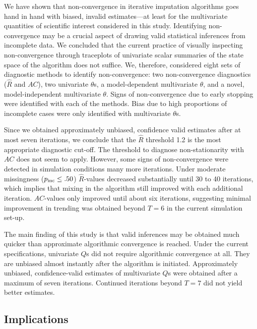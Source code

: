 \documentclass[Royal,times,sageh]{sagej}
\begin{document}
We have shown that non-convergence in iterative imputation algorithms goes hand in hand with biased, invalid estimates---at least for the multivariate quantities of scientific interest considered in this study. Identifying non-convergence may be a crucial aspect of drawing valid statistical inferences from incomplete data. We concluded that the current practice of visually inspecting non-convergence through traceplots of univariate scalar summaries of the state space of the algorithm does not suffice. We, therefore, considered eight sets of diagnostic methods to identify non-convergence: two non-convergence diagnostics (\(\widehat{R}\) and \(AC\)), two univariate \(\theta\)s, a model-dependent multivariate \(\theta\), and a novel, model-independent multivariate \(\theta\). Signs of non-convergence due to early stopping were identified with each of the methods. Bias due to high proportions of incomplete cases were only identified with multivariate \(\theta\)s.

Since we obtained approximately unbiased, confidence valid estimates after at most seven iterations, we conclude that the \(\widehat{R}\) threshold 1.2 is the most appropriate diagnostic cut-off. The threshold to diagnose non-stationarity with \(AC\) does not seem to apply. However, some signs of non-convergence were detected in simulation conditions many more iterations. Under moderate missingness (\(p_{\rm inc}\leq.50\)) \(\widehat{R}\)-values decreased substantially until 30 to 40 iterations, which implies that mixing in the algorithm still improved with each additional iteration. \(AC\)-values only improved until about six iterations, suggesting minimal improvement in trending was obtained beyond \(T=6\) in the current simulation set-up.

The main finding of this study is that valid inferences may be obtained much quicker than approximate algorithmic convergence is reached. Under the current specifications, univariate \(Q\)s did not require algorithmic convergence at all. They are unbiased almost instantly after the algorithm is initiated. Approximately unbiased, confidence-valid estimates of multivariate \(Q\)s were obtained after a maximum of seven iterations. Continued iterations beyond \(T = 7\) did not yield better estimates.

\hypertarget{implications}{%
\subsection{Implications}\label{implications}}
\end{document}

